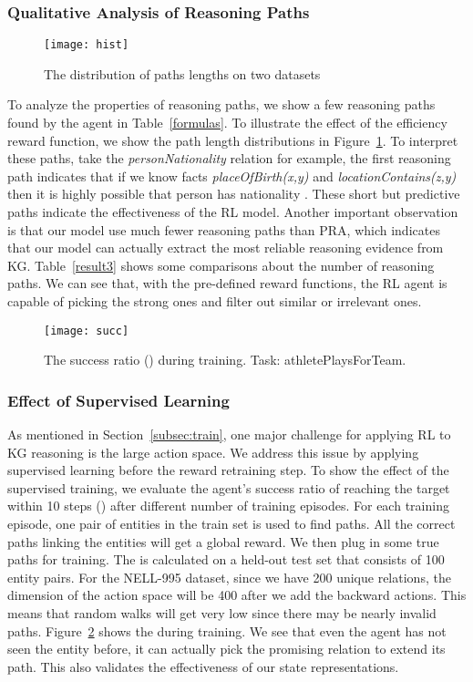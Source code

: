 \documentclass[11pt,letterpaper]{article}
\begin{document}
\subsubsection{Qualitative Analysis of Reasoning Paths}

\begin{figure}[t]
\centering
\texttt{[image: hist]}
\caption{The distribution of paths lengths on two datasets}
\label{hist}
\end{figure}

To analyze the properties of reasoning paths, we show a few reasoning paths found by the agent in Table~\ref{formulas}. To illustrate the effect of the efficiency reward function, we show the path length distributions in Figure~\ref{hist}. To interpret these paths, take the \textit{personNationality} relation for example, the first reasoning path indicates that if we know facts \textit{placeOfBirth(x,y)} and \textit{locationContains(z,y)} then it is highly possible that person  has nationality . These short but predictive paths indicate the effectiveness of the RL model. Another important observation is that our model use much fewer reasoning paths than PRA, which indicates that our model can actually extract the most reliable reasoning evidence from KG. Table~\ref{result3} shows some comparisons about the number of reasoning paths. We can see that, with the pre-defined reward functions, the RL agent is capable of picking the strong ones and filter out similar or irrelevant ones.


\begin{figure}[t]
\centering
\texttt{[image: succ]}
\caption{The success ratio () during training. Task: athletePlaysForTeam.\footnotemark}
\label{stats1}
\end{figure}


\subsubsection{Effect of Supervised Learning}
As mentioned in Section~\ref{subsec:train}, one major challenge for applying RL to KG reasoning is the large action space. We address this issue by applying supervised learning before the reward retraining step. To show the effect of the supervised training, we evaluate the agent's success ratio of reaching the target within 10 steps () after different number of training episodes. For each training episode, one pair of entities  in the train set is used to find paths. All the correct paths linking the entities will get a  global reward. We then plug in some true paths for training. The  is calculated on a held-out test set that consists of 100 entity pairs. For the NELL-995 dataset, since we have 200 unique relations, the dimension of the action space will be 400 after we add the backward actions. This means that random walks will get very low  since there may be nearly  invalid paths. Figure~\ref{stats1} shows the  during training. We see that even the agent has not seen the entity before, it can actually pick the promising relation to extend its path. This also validates the effectiveness of our state representations.
\end{document}
